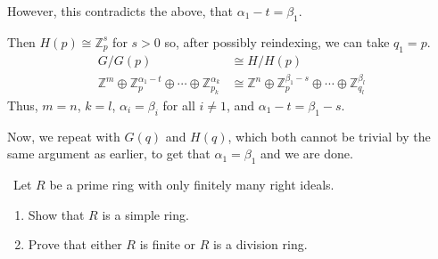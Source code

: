 \documentclass[12pt]{Qual}
\begin{document}
\begin{solution}
\begin{enumerate}[label=(\alph*)]
    However, this contradicts the above, that $\alpha_1-t=\beta_1.$ \contradiction

     Then $H(p)\cong\mathbb{Z}_p^s$ for $s>0$ so, after possibly reindexing, we can take $q_1=p.$ \begin{align*}
        G/G(p)&\cong H/H(p)\\
        \mathbb{Z}^m\oplus\mathbb{Z}_{p}^{\alpha_1-t}\oplus\cdots\oplus\mathbb{Z}_{p_k}^{\alpha_k}&\cong \mathbb{Z}^n\oplus\mathbb{Z}_{p}^{\beta_1-s}\oplus\cdots\oplus\mathbb{Z}_{q_l}^{\beta_l}
    \end{align*} Thus, $m=n$, $k=l$, $\alpha_i=\beta_i$ for all $i\not=1$, and $\alpha_1-t=\beta_1-s$.

    Now, we repeat with $G(q)$ and $H(q)$, which both cannot be trivial by the same argument as earlier, to get that $\alpha_1=\beta_1$ and we are done.
\end{enumerate}
\end{solution}
\newpage

\begin{problem} $\,$
Let $R$ be a prime ring with only finitely many right ideals.
\begin{enumerate}[label=(\alph*)]
    \item Show that $R$ is a simple ring.
    \item Prove that either $R$ is finite or $R$ is a division ring.
\end{enumerate}
\end{problem}
\end{document}
